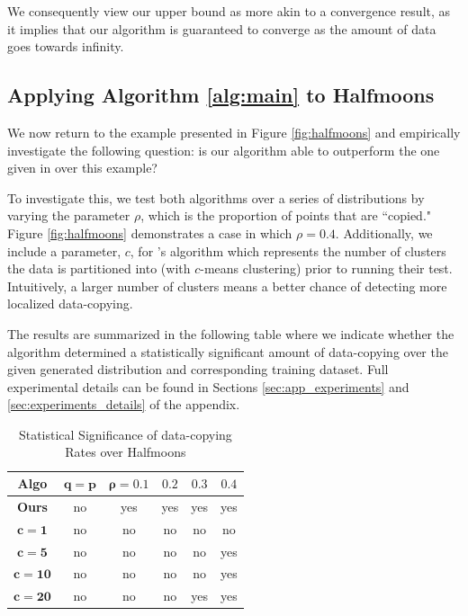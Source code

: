 We consequently view our upper bound as more akin to a convergence result, as it implies that our algorithm is guaranteed to converge as the amount of data goes towards infinity.

\subsection{Applying Algorithm \ref{alg:main} to Halfmoons}\label{sec:experiments}

We now return to the example presented in Figure \ref{fig:halfmoons} and empirically investigate the following question: is our algorithm able to outperform the one given in \cite{MCD2020} over this example? 

To investigate this, we test both algorithms over a series of distributions by varying the parameter $\rho$, which is the proportion of points that are ``copied." Figure \ref{fig:halfmoons} demonstrates a case in which $\rho = 0.4$. Additionally, we include a parameter, $c$, for \cite{MCD2020}'s algorithm which represents the number of clusters the data is partitioned into (with $c$-means clustering) prior to running their test. Intuitively, a larger number of clusters means a better chance of detecting more localized data-copying.

The results are summarized in the following table where we indicate whether the algorithm determined a statistically significant amount of data-copying over the given generated distribution and corresponding training dataset. Full experimental details can be found in Sections \ref{sec:app_experiments} and \ref{sec:experiments_details} of the appendix.

\begin{table}[h]
\caption{Statistical Significance of data-copying Rates over Halfmoons} \label{results_main}
\begin{center}
\begin{tabular}{ |c||c|c|c|c|c| } 
 \hline
 \textbf{Algo} & $\mathbf{q = p}$ & $\mathbf{\rho = 0.1}$ & $\mathbf{0.2}$ & $\mathbf{0.3}$ & $\mathbf{0.4}$ \\ 
 \hline
 \hline
 \textbf{Ours} & \color{blue}no & \color{red}yes & \color{red}yes & \color{red}yes & \color{red}yes \\ 
 \hline
 $\mathbf{c=1}$ & \color{blue}no & \color{blue}no & \color{blue}no & \color{blue}no & \color{blue}no \\ 
 \hline
 $\mathbf{c=5}$ & \color{blue}no & \color{blue}no & \color{blue}no & \color{blue}no & \color{red}yes \\ 
 \hline
 $\mathbf{c=10}$ & \color{blue}no & \color{blue}no & \color{blue}no & \color{blue}no & \color{red}yes \\ 
 \hline
 $\mathbf{c=20}$ & \color{blue}no & \color{blue}no& \color{blue}no & \color{red}yes & \color{red}yes\\ 
 \hline
\end{tabular}
\end{center}
\end{table}

